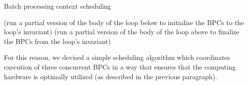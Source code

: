 \documentclass[12pt,oneside]{fithesis2}
\begin{document}
      \begin{algorithm}
        \caption{Batch processing context scheduling}
        \label{alg:bpcSched}
        \begin{algorithmic}[1]
            \State {}
            \State {}
            \State {}
            \State {}
          \EndProcedure
          \State
            \State {}
            \State {}
            \State {}
          \EndProcedure
          \State
            \State (run a partial version of the body of the loop below to initialize the BPCs to the loop's invariant)
              \State {}
              \State {}
              \State {}
              \State {}
              \State {}
              \State {}
            \EndWhile
            \State (run a partial version of the body of the loop above to finalize the BPCs from the loop's invariant)
          \EndProcedure
        \end{algorithmic}
      \end{algorithm}
      
      For this reason, we devised a simple scheduling algorithm which coordinates execution of three concurrent BPCs in a way that ensures that the computing hardware is optimally utilized (as described in the previous paragraph).
      
\end{document}
